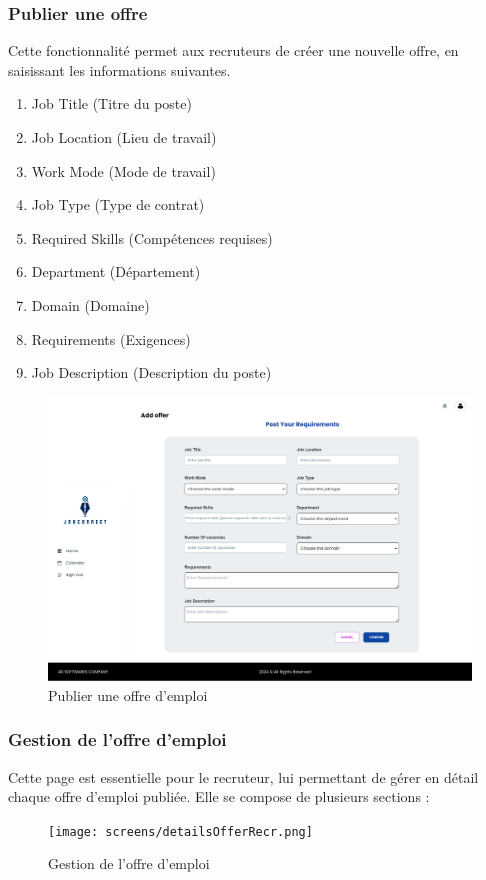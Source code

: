 \subsubsection{Publier une offre}

Cette fonctionnalité permet aux recruteurs de créer une nouvelle offre, en saisissant les informations suivantes.
\begin{enumerate}
   \item Job Title (Titre du poste)
   \item Job Location (Lieu de travail)
   \item Work Mode (Mode de travail)
   \item Job Type (Type de contrat)
   \item Required Skills (Compétences requises)
   \item Department (Département)
   \item Domain (Domaine)
   \item Requirements (Exigences)
   \item Job Description (Description du poste)
\end{enumerate}

\begin{figure}[htbp]
   \centering
   \includegraphics[scale=0.15]{screens/addOffer.png} 
   \caption{Publier une offre d'emploi}
   \label{fig:addOfferFields}
\end{figure}

\subsubsection{Gestion de l'offre d'emploi}
Cette page est essentielle pour le recruteur, lui permettant de gérer en détail chaque offre d'emploi publiée. Elle se compose de plusieurs sections :
\begin{figure}[htbp]
   \centering
   \texttt{[image: screens/detailsOfferRecr.png]}
   \caption{Gestion de l'offre d'emploi}
   \label{fig:listOffers}
\end{figure}

